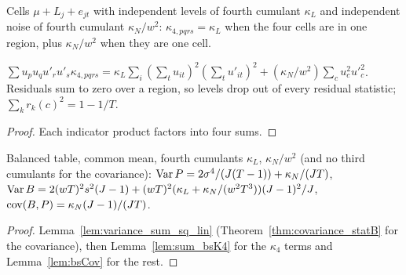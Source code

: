 \begin{definition}\label{def:bsK4}
  \leanok
  Cells $\mu + L_j + e_{jt}$ with independent levels of fourth cumulant $\kappa_L$ and independent
  noise of fourth cumulant $\kappa_N/w^2$: $\kappa_{4,pqrs} = \kappa_L$ when the four cells are in one
  region, plus $\kappa_N/w^2$ when they are one cell.
\end{definition}

\begin{lemma}\label{lem:sum_bsK4}
  \leanok
  $\sum u_pu_qu'_ru'_s\kappa_{4,pqrs} = \kappa_L\sum_i(\sum_tu_{it})^2(\sum_tu'_{it})^2
  + (\kappa_N/w^2)\sum_c u_c^2u'^2_c$. Residuals sum to zero over a region, so levels drop out of
  every residual statistic; $\sum_k r_k(c)^2 = 1 - 1/T$.
\end{lemma}
\begin{proof}
  \leanok
  Each indicator product factors into four sums.
\end{proof}

\begin{theorem}\label{thm:variance_stat_balanced_cumulants}
  \leanok
  Balanced table, common mean, fourth cumulants $\kappa_L$, $\kappa_N/w^2$ (and no third cumulants
  for the covariance):
  $\operatorname{Var} P = 2\sigma^4/(J(T - 1)) + \kappa_N/(JT)$,
  $\operatorname{Var} B = 2(wT)^2s^2(J - 1) + (wT)^2(\kappa_L + \kappa_N/(w^2T^3))(J - 1)^2/J$,
  $\operatorname{cov}(B, P) = \kappa_N(J - 1)/(JT)$.
\end{theorem}
\begin{proof}
  \leanok
  Lemma~\ref{lem:variance_sum_sq_lin} (Theorem~\ref{thm:covariance_statB} for the covariance), then
  Lemma~\ref{lem:sum_bsK4} for the $\kappa_4$ terms and Lemma~\ref{lem:bsCov} for the rest.
\end{proof}

